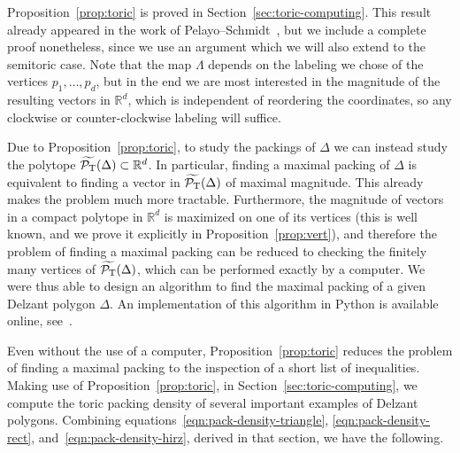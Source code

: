 \documentclass[pdftex]{sigma}
\numberwithin{equation}{section}
\def\R{{\mathbb R}}
\newcommand{\De}{\Delta}
\newcommand{\PT}{\mathcal{P}_{\rm T}}
\newcommand{\PTtilde}{\widetilde{\PT}}
\begin{document}
Proposition~\ref{prop:toric} is proved in Section~\ref{sec:toric-computing}.
This result already appeared in the work of Pelayo--Schmidt~\cite{PeSc2008}, but we include a complete proof nonetheless, since we use an argument which we will also extend to the semitoric case.
Note that the map $\Lambda$ depends on the labeling we chose of the vertices $p_1,\ldots, p_d$, but in the end we are most interested in the magnitude of the resulting vectors in $\R^d$, which is independent of reordering the coordinates, so any clockwise or counter-clockwise labeling will suffice.


Due to Proposition~\ref{prop:toric}, to study the packings of $\De$ we can instead study the polytope ${\PTtilde(\Delta)\subset\R^d}$.
In particular, finding a maximal packing of $\De$ is equivalent to finding a vector in $\PTtilde(\Delta)$ of maximal magnitude.
This already makes the problem much more tractable.
Furthermore, the magnitude of vectors in a compact polytope in $\R^d$ is maximized on one of its vertices (this is well known, and we prove it explicitly in Proposition~\ref{prop:vert}), and therefore the problem of finding a maximal packing can be reduced to checking the finitely many vertices of $\PTtilde(\De)$, which can be performed exactly by a computer.
We were thus able to design an algorithm to find the maximal packing of a given Delzant polygon $\Delta$.
An implementation of this algorithm in Python is available online, see~\cite{alg-url}.

Even without the use of a computer, Proposition~\ref{prop:toric} reduces the problem of finding a maximal packing to the inspection of a short list of inequalities.
Making use of Proposition~\ref{prop:toric}, in Section~\ref{sec:toric-computing}, we compute the toric packing density of several important examples of Delzant polygons.
Combining equations~\eqref{eqn:pack-density-triangle}, \eqref{eqn:pack-density-rect}, and~\eqref{eqn:pack-density-hirz}, derived in that section, we have the following.
\end{document}
